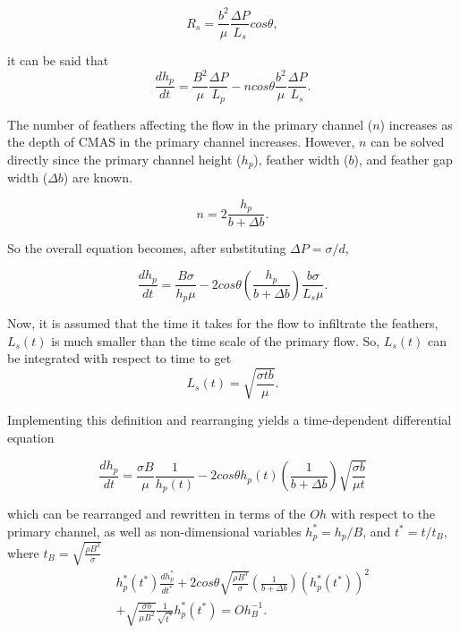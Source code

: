 \documentclass{UCF_ETD}
\begin{document}
\begin{equation}
    R_{s} = \frac{b^{2}}{\mu}\frac{\Delta P}{L_{s}}cos\theta,
\end{equation}

\noindent it can be said that 
\begin{equation}
        \frac{dh_{p}}{dt} = \frac{B^{2}}{\mu}\frac{\Delta P}{L_{p}} -ncos\theta\frac{b^{2}}{\mu}\frac{\Delta P}{L_{s}}.
\end{equation}

\noindent The number of feathers affecting the flow in the primary channel ($n$) increases as the depth of CMAS in the primary channel increases. However, $n$ can be solved directly since the primary channel height ($h_p$), feather width ($b$), and feather gap width ($\Delta b$) are known.

\begin{equation}
    n = 2\frac{h_{p}}{b + \Delta b}.
\end{equation}

\noindent So the overall equation becomes, after substituting $\Delta P = \sigma/d$,

\begin{equation}
    \frac{dh_{p}}{dt} = \frac{B \sigma}{h_{p}\mu} - 2 cos\theta\left(\frac{h_{p}}{b + \Delta b} \right)\frac{b \sigma}{L_{s}\mu}.
\end{equation}


\noindent Now, it is assumed that the time it takes for the flow to infiltrate the feathers, $L_{s}(t)$ is much smaller than the time scale of the primary flow. So, $L_{s}(t)$ can be integrated with respect to time to get 
\begin{equation}
    L_{s}\left( t \right) = \sqrt{\frac{\sigma t b}{\mu}}.
\end{equation}

\noindent Implementing this definition and rearranging yields a time-dependent differential equation

\begin{equation}
    \frac{dh_{p}}{dt} = \frac{\sigma B}{\mu} \frac{1}{h_{p}(t)} - 2 cos\theta h_{p}(t) \left( \frac{1}{b+\Delta b} \right) \sqrt{\frac{\sigma b}{\mu t}}
    \label{eq:FPNM_dimensional}
\end{equation}

\noindent which can be rearranged and rewritten in terms of the $Oh$ with respect to the primary channel, as well as non-dimensional variables $h_p^* = h_p/B$, and $t^* = t/t_{B}$, where $t_{B} = \sqrt{\frac{\rho B^{3}}{\sigma}}$
\begin{eqnarray}
\label{eq:FPNM_non-dimensional}
    &&h_{p}^{*}\left(t^{*}\right)\frac{dh_{p}^{*}}{dt^{*}} + 2 cos\theta \sqrt{\frac{\rho B^{3}}{\sigma}} \left( \frac{1}{b+\Delta b} \right)\left(h_{p}^{*}\left(t^{*}\right)\right)^{2} \\
    && + \sqrt{\frac{\sigma b}{\mu B^{2}}} \frac{1}{\sqrt{t^{*}}} h_{p}^{*} \left(t^{*}\right) = Oh_{B}^{-1}. \nonumber
\end{eqnarray}
\end{document}
